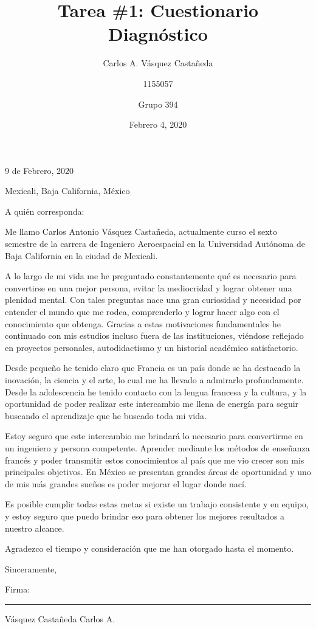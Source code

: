\documentclass[12pt, letterpaper]{article}
\title{Tarea \#1: Cuestionario Diagnóstico}
\author{Carlos A. Vásquez Castañeda \and 1155057 \and Grupo 394}
\date{Febrero 4, 2020}
\begin{document}
\hspace*{\fill} 9 de Febrero, 2020

\hspace*{\fill} Mexicali, Baja California, México

A quién corresponda:

Me llamo Carlos Antonio Vásquez Castañeda, actualmente curso el sexto semestre de la carrera de Ingeniero Aeroespacial en la Universidad Autónoma de Baja California en la ciudad de Mexicali.

A lo largo de mi vida me he preguntado constantemente qué es necesario para convertirse en una mejor persona, evitar la mediocridad y lograr obtener una plenidad mental. Con tales preguntas nace una gran curiosidad y necesidad por entender el mundo que me rodea, comprenderlo y lograr hacer algo con el conocimiento que obtenga. Gracias a estas motivaciones fundamentales he continuado con mis estudios incluso fuera de las instituciones, viéndose reflejado en proyectos personales, autodidactismo y un historial académico satisfactorio.

Desde pequeño he tenido claro que Francia es un país donde se ha destacado la inovación, la ciencia y el arte, lo cual me ha llevado a admirarlo profundamente. Desde la adolescencia he tenido contacto con la lengua francesa y la cultura, y la oportunidad de poder realizar este intercambio me llena de energía para seguir buscando el aprendizaje que he buscado toda mi vida. 

Estoy seguro que este intercambio me brindará lo necesario para convertirme en un ingeniero y persona competente. Aprender mediante los métodos de enseñanza francés y poder transmitir estos conocimientos al país que me vio crecer son mis principales objetivos. En México se presentan grandes áreas de oportunidad y uno de mis más grandes sueños es poder mejorar el lugar donde nací.

Es posible cumplir todas estas metas si existe un trabajo consistente y en equipo, y estoy seguro que puedo brindar eso para obtener los mejores resultados a nuestro alcance. 

Agradezco el tiempo y consideración que me han otorgado hasta el momento.

\hspace*{\fill} Sinceramente,

\hspace*{\fill} Firma: \noindent\rule{6cm}{0.4pt}

\hspace*{\fill} Vásquez Castañeda Carlos A.
\renewcommand\refname{References}
\printbibliography
\end{document}
